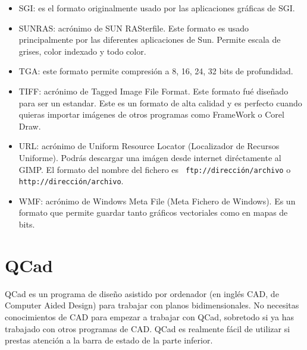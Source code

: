 \begin{itemize}
\item  SGI: es  el formato  originalmente usado  por las  aplicaciones
gráficas de SGI.

\item  SUNRAS:  acrónimo de  SUN  RASterfile.  Este formato  es  usado
principalmente por las diferentes  aplicaciones de Sun. Permite escala
de grises, color indexado y todo color.

\item TGA:  este formato permite  compresión a 8,  16, 24, 32  bits de
profundidad.

\item TIFF:  acrónimo de  Tagged Image File  Format. Este  formato fué
diseñado para ser un estandar. Este es un formato de alta calidad y es
perfecto  cuando quieras  importar  imágenes de  otros programas  como
FrameWork o Corel Draw.

\item  URL:  acrónimo  de  Uniform Resource  Locator  (Localizador  de
Recursos  Uniforme).  Podrás  descargar   una  imágen  desde  internet
diréctamente al {\sf GIMP}. El formato  del nombre del fichero es {\tt
ftp://dirección/archivo} o {\tt http://dirección/archivo}.

\item WMF: acrónimo de Windows Meta File (Meta Fichero de Windows). Es
un  formato que  permite guardar  tanto gráficos  vectoriales como  en
mapas de bits.

\end{itemize}





\section{QCad}


{\sf  QCad}  es un  programa  de  diseño  asistido por  ordenador  (en
inglés  CAD,  de  Computer  Aided Design)  para  trabajar  con  planos
bidimensionales.  No necesitas  conocimientos  de CAD  para empezar  a
trabajar  con {\sf  QCad}, sobretodo  si  ya has  trabajado con  otros
programas de CAD. {\sf QCad} es realmente fácil de utilizar si prestas
atención a la barra de estado de la parte inferior.

